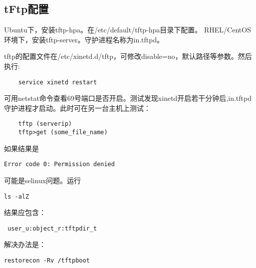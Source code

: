 \subsection{tFtp配置}
Ubuntu下，安装tftp-hpa。在/etc/default/tftp-hpa目录下配置。
RHEL/CentOS环境下，安装tftp-server。守护进程名称为in.tftpd。

tftp的配置文件在/etc/xinetd.d/tftp，可修改disable=no，默认路径等参数。然后执行:
\begin{lstlisting}
    service xinetd restart
\end{lstlisting}

可用netstat命令查看69号端口是否开启。测试发现xinetd开启若干分钟后,in.tftpd守护进程才启动。此时可在另一台主机上测试：

\begin{lstlisting}
    tftp (serverip)
    tftp>get (some_file_name)
\end{lstlisting}

如果结果是
\begin{lstlisting}
Error code 0: Permission denied
\end{lstlisting}
可能是selinux问题。运行
\begin{lstlisting}
ls -alZ
\end{lstlisting}
结果应包含：
\begin{lstlisting}
 user_u:object_r:tftpdir_t
\end{lstlisting}

解决办法是：
\begin{lstlisting}
restorecon -Rv /tftpboot 
\end{lstlisting}




